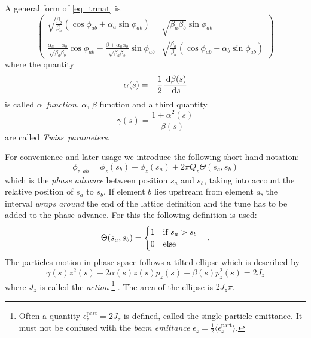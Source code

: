 A general form of \eqref{eq_trmat} is 
%
\begin{equation}
    \begin{pmatrix}
        \sqrt{\frac{\beta_b}{\beta_a}}(\cos\phi_{ab} + \alpha_a \sin\phi_{ab}) &
        \sqrt{\beta_a\beta_b} \sin\phi_{ab} \\
        \frac{\alpha_a - \alpha_b}{\sqrt{\beta_a\beta_b}}\cos\phi_{ab} - \frac{\beta+\alpha_a\alpha_b}{\sqrt{\beta_a\beta_b}}\sin\phi_{ab} &
        \sqrt{\frac{\beta_a}{\beta_b}}(\cos\phi_{ab} - \alpha_b\sin\phi_{ab})
    \end{pmatrix}
    \label{eq_trmat_01}
\end{equation}
%
where the quantity
%
\begin{equation}
    \alpha(s) = -\frac{1}{2}\frac{\;\text{d} \beta(s)}{ \;\text{d} s}
    \label{eq_alpha}
\end{equation}
%
is called $\alpha$~\emph{function}.
%
$\alpha$, $\beta$ function and a third quantity
%
\begin{equation}
    \gamma(s) = \frac{1+\alpha^2(s)}{\beta(s)}
\end{equation}
%
are called \emph{Twiss~parameters}.

For convenience and later usage we introduce the following short-hand notation:
%
\begin{equation}
    \phi_{z,ab} = \phi_z(s_b) - \phi_z(s_a) + 2\pi Q_z \Theta(s_a, s_b)
\end{equation}
%
which is the \emph{phase advance} between position $s_a$ and $s_b$, taking into
account the relative position of $s_a$ to $s_b$.
If element $b$ lies upstream from element $a$, the interval \emph{wraps around} the end of the
lattice definition and the tune
has to be added to the phase advance. For this the following definition is used:
%
\begin{equation}
    \Theta(s_a, s_b) =
    \begin{cases}
        1 & \text{if } s_a > s_b \\
        0 & \text{else} \\
    \end{cases}
    \quad .
\end{equation}
%
The particles motion in phase space follows a tilted ellipse which is described by
%
\begin{equation}
    \gamma(s)z^2(s) + 2\alpha(s)z(s)p_z(s) + \beta(s)p_z^2(s) = 2 J_z
\end{equation}
%
where $J_z$ is called the \emph{action}%
\footnote{
    Often a quantity $\epsilon^\text{part}_z=2 J_z$ is defined, called the single particle emittance.
    It must not be confused with the \emph{beam emittance}
    $\epsilon_z = \frac{1}{2}\langle \epsilon_z^\text{part} \rangle$.
}%
. The area of the ellipse is $2J_z\pi$.

